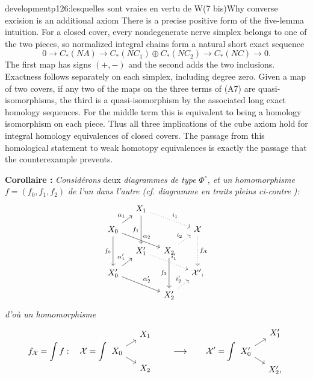 \begin{dcomment}{development}{p126:lesquelles sont vraies en vertu de W(7 bis)}{Why converse excision is an additional axiom}
There is a precise positive form of the five-lemma intuition.  For a closed cover, every nondegenerate nerve simplex belongs to one of the two pieces, so normalized integral chains form a natural short exact sequence
\[
 0\longrightarrow C_*(NA)
  \longrightarrow C_*(NC_1)\oplus C_*(NC_2)
  \longrightarrow C_*(NC)\longrightarrow0.
 \tag{A7}
\]
The first map has signs $(+,-)$ and the second adds the two inclusions.  Exactness follows separately on each simplex, including degree zero.  Given a map of two covers, if any two of the maps on the three terms of (A7) are quasi-isomorphisms, the third is a quasi-isomorphism by the associated long exact homology sequences.  For the middle term this is equivalent to being a homology isomorphism on each piece.  Thus all three implications of the cube axiom hold for integral homology equivalences of closed covers.  The passage from this homological statement to weak homotopy equivalences is exactly the passage that the counterexample prevents.
\end{dcomment}


\textbf{Corollaire :} \textit{Considérons} deux \textit{diagrammes de type} $\Phi^{\circ}$\textit{, et un homomorphisme} $f = (f_0, f_1, f_2)$ \textit{de l'un dans l'autre (cf. diagramme en traits pleins ci-contre} \textit{):}
\[
\begin{tikzcd}[column sep=small, row sep=small, ampersand replacement=\&]
 \& X_1 \arrow[dd, "f_1"'] \arrow[drr, dotted, "i_1"] \& \& \\
X_0 \arrow[ur, "\alpha_1"] \arrow[drr, "\alpha_2"] \arrow[dd, "f_0"'] \& \& \& \cX \arrow[dd, dotted, "f_{\cX}"] \\
 \& X'_1 \arrow[drr, dotted, "i'_1"] \& X_2 \arrow[ur, dotted, "i_2"] \arrow[dd, "f_2"'] \& \\
X'_0 \arrow[ur, "\alpha'_1"] \arrow[drr, "\alpha'_2"] \& \& \& \cX', \\
 \& \& X'_2 \arrow[ur, dotted, "i'_2"] \&
\end{tikzcd}
\]
\textit{d'où un homomorphisme}
\[
f_{\cX} = \int f : \quad \cX = \int
\begin{tikzcd}[column sep=small, row sep=tiny, ampersand replacement=\&, baseline=(\tikzcdmatrixname-2-1.base)]
 \& X_1 \\
X_0 \arrow[ur] \arrow[dr] \& \\
 \& X_2
\end{tikzcd}
\qquad\longrightarrow\qquad
\cX' = \int
\begin{tikzcd}[column sep=small, row sep=tiny, ampersand replacement=\&, baseline=(\tikzcdmatrixname-2-1.base)]
 \& X'_1 \\
X'_0 \arrow[ur] \arrow[dr] \& \\
 \& X'_2,
\end{tikzcd}
\]

